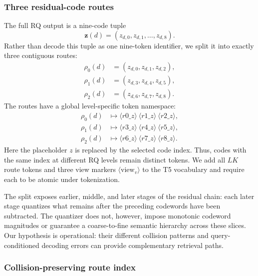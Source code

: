 \subsubsection{Three residual-code routes}

The full RQ output is a nine-code tuple
\begin{equation}
    \mathbf{z}(d)=(z_{d,0},z_{d,1},\ldots,z_{d,8}).
\end{equation}
Rather than decode this tuple as one nine-token identifier, we split it into exactly three contiguous routes:
\begin{align}
    \rho_0(d)&=(z_{d,0},z_{d,1},z_{d,2}),\\
    \rho_1(d)&=(z_{d,3},z_{d,4},z_{d,5}),\\
    \rho_2(d)&=(z_{d,6},z_{d,7},z_{d,8}).
\end{align}
The routes have a global level-specific token namespace:
\begin{align}
    \rho_0(d)&\mapsto \langle r0\_z\rangle\ \langle r1\_z\rangle\ \langle r2\_z\rangle,\\
    \rho_1(d)&\mapsto \langle r3\_z\rangle\ \langle r4\_z\rangle\ \langle r5\_z\rangle,\\
    \rho_2(d)&\mapsto \langle r6\_z\rangle\ \langle r7\_z\rangle\ \langle r8\_z\rangle.
\end{align}
Here the placeholder $z$ is replaced by the selected code index. Thus, codes with the same index at different RQ levels remain distinct tokens. We add all $LK$ route tokens and three view markers $\langle\mathrm{view}_v\rangle$ to the T5 vocabulary and require each to be atomic under tokenization.

The split exposes earlier, middle, and later stages of the residual chain: each later stage quantizes what remains after the preceding codewords have been subtracted. The quantizer does not, however, impose monotonic codeword magnitudes or guarantee a coarse-to-fine semantic hierarchy across these slices. Our hypothesis is operational: their different collision patterns and query-conditioned decoding errors can provide complementary retrieval paths.

\subsubsection{Collision-preserving route index}


